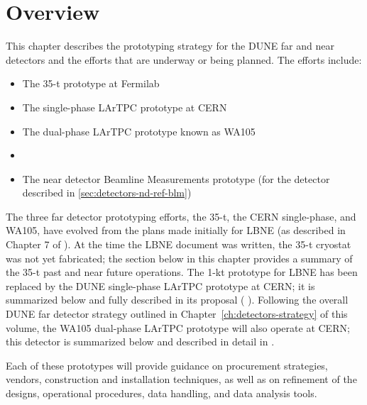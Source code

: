 \section{Overview}
\label{sec:proto-overview}


This chapter describes the prototyping strategy for the DUNE  far and near detectors and the efforts that are underway or being planned.  The efforts include:

\begin{itemize}
\item The 35-t prototype at Fermilab
\item The single-phase LArTPC prototype at CERN
\item The dual-phase LArTPC prototype known as WA105 
\item {}
\item The near detector Beamline Measurements prototype (for the detector described in \ref{sec:detectors-nd-ref-blm})
\end{itemize}

The three far detector prototyping efforts, the 35-t, the CERN
single-phase, and WA105, have evolved from the plans made initially
for LBNE (as described in Chapter 7 of \anxlbnefd ).  At the time the
LBNE document was written, the 35-t cryostat was not yet fabricated;
the section below in this chapter provides a summary of the 35-t
past and near future operations.  The 1-kt prototype for LBNE has
been replaced by the DUNE single-phase LArTPC prototype at CERN; it is
summarized below and fully described in its proposal (\anxcernproto
).  Following the overall DUNE far detector strategy outlined in
Chapter~\ref{ch:detectors-strategy} of this volume, the WA105
dual-phase LArTPC prototype will also operate at CERN; this detector
is summarized below and described in detail in \anxdualtdr .


Each of these prototypes will provide guidance on procurement
strategies, vendors, construction and installation techniques, as well
as on refinement of the designs, operational procedures, data handling,
and data analysis tools.
